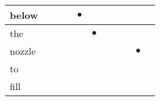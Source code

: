 \documentclass[landscape]{article}
\newcommand{\ssp}{\hspace{2pt}}
\newcommand{\mex}{\cellcolor{g}$\bullet$}
\begin{document}
\begin{tabular}{|l|p{10pt}|p{10pt}|p{10pt}|p{10pt}|p{10pt}|p{10pt}|p{10pt}|p{10pt}|p{10pt}|p{10pt}|}
\hline
\ssp \cellcolor{ref3}below \ssp&\hspace{2pt}&\hspace{2pt}&\hspace{2pt}&\hspace{2pt}\mex&\hspace{2pt}&\hspace{2pt}&\hspace{2pt}&\hspace{2pt}&\hspace{2pt}&\hspace{2pt}\\
\hline
\ssp \cellcolor{ref4}the \ssp&\hspace{2pt}&\hspace{2pt}&\hspace{2pt}&\hspace{2pt}&\hspace{2pt}\mex&\hspace{2pt}&\hspace{2pt}&\hspace{2pt}&\hspace{2pt}&\hspace{2pt}\\
\hline
\ssp \cellcolor{ref8}nozzle \ssp&\hspace{2pt}&\hspace{2pt}&\hspace{2pt}&\hspace{2pt}&\hspace{2pt}&\hspace{2pt}&\hspace{2pt}&\hspace{2pt}&\hspace{2pt}\mex&\hspace{2pt}\\
\hline
\ssp to \ssp&\hspace{2pt}&\hspace{2pt}&\hspace{2pt}&\hspace{2pt}&\hspace{2pt}&\hspace{2pt}&\hspace{2pt}&\hspace{2pt}&\hspace{2pt}&\hspace{2pt}\\
\hline
\ssp fill \ssp&\hspace{2pt}&\hspace{2pt}&\hspace{2pt}&\hspace{2pt}&\hspace{2pt}&\hspace{2pt}&\hspace{2pt}&\hspace{2pt}&\hspace{2pt}&\hspace{2pt}\\

\end{tabular}
\end{document}
